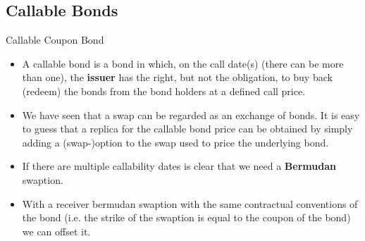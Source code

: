 \documentclass{beamer}
\begin{document}

	\subsection{Callable Bonds}
	\begin{frame}{Callable Coupon Bond}
		\begin{itemize}
			\item<1-> A \textcolor{maincolor}{callable bond} is a bond in which, on the call date(s) (there can be more than one), the \textbf{issuer} has the right, but not the obligation, to buy back (redeem) the bonds from the bond holders at a defined call price.
			\item<2-> We have seen that a swap can be regarded as an exchange of bonds. It is easy to guess that a replica for the callable bond price can be obtained by simply adding a (swap-)option to the swap used to price the underlying bond.
			\item<3-> If there are multiple callability dates is clear that we need a \textbf{Bermudan} swaption.
			\item<3-> With a receiver bermudan swaption with the same contractual conventions of the bond (i.e. the strike of the swaption is equal to the coupon of the bond) we can offset it. %
		\end{itemize}
	\end{frame}
\end{document}

